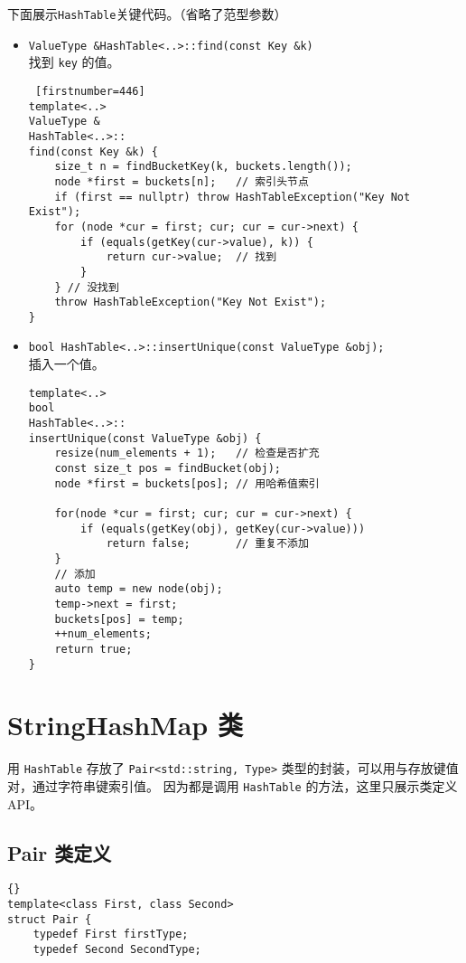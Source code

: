 {下面展示\lstinline{HashTable}关键代码。（省略了范型参数）

\begin{itemize}
      \item \lstinline{ValueType &HashTable<..>::find(const Key &k)}\\
            找到 \lstinline{key} 的值。
\begin{lstlisting} [firstnumber=446]
template<..>
ValueType &
HashTable<..>::
find(const Key &k) {
    size_t n = findBucketKey(k, buckets.length());
    node *first = buckets[n];   // 索引头节点
    if (first == nullptr) throw HashTableException("Key Not Exist");
    for (node *cur = first; cur; cur = cur->next) {
        if (equals(getKey(cur->value), k)) {
            return cur->value;  // 找到
        }
    } // 没找到
    throw HashTableException("Key Not Exist");
}\end{lstlisting}
      \item \lstinline{bool HashTable<..>::insertUnique(const ValueType &obj);} \\
            插入一个值。
\begin{lstlisting}[escapechar=^, firstnumber=409]
template<..>
bool
HashTable<..>::
insertUnique(const ValueType &obj) {
    resize(num_elements + 1);   // 检查是否扩充
    const size_t pos = findBucket(obj);
    node *first = buckets[pos]; // 用哈希值索引

    for(node *cur = first; cur; cur = cur->next) {
        if (equals(getKey(obj), getKey(cur->value)))
            return false;       // 重复不添加
    }
    // 添加
    auto temp = new node(obj);
    temp->next = first;
    buckets[pos] = temp;
    ++num_elements;
    return true;
}\end{lstlisting}
\end{itemize}


\section{StringHashMap 类}

用 \lstinline{HashTable} 存放了 \lstinline{Pair<std::string, Type>} 类型的封装，可以用与存放键值对，通过字符串键索引值。%
因为都是调用 \lstinline{HashTable} 的方法，这里只展示类定义 API。


\subsection{Pair 类定义}
\begin{lstlisting}[firstnumber=551, caption=Pair 类定义]{}
template<class First, class Second>
struct Pair {
    typedef First firstType;
    typedef Second SecondType;


\end{lstlisting}}
